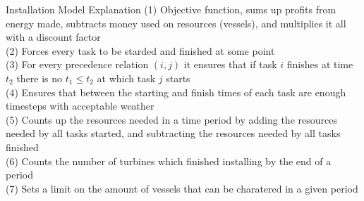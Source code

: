 \documentclass{beamer}
\begin{document}
\begin{frame}{Installation Model Explanation}
(1) Objective function, sums up profits from energy made, subtracts money used on resources (vessels), and multiplies it all with a discount factor	\\
(2) Forces every task to be starded and finished at some point	\\
(3) For every precedence relation $(i, j)$ it ensures that if task $i$ finishes at time $t_2$ there is no $t_1 \leq t_2$ at which task $j$ starts 	\\
(4) Ensures that between the starting and finish times of each task are enough timesteps with acceptable weather	\\
(5) Counts up the resources needed in a time period by adding the resources needed by all tasks started, and subtracting the resources needed by all tasks finished	\\
(6) Counts the number of turbines which finished installing by the end of a period	\\
(7) Sets a limit on the amount of vessels that can be charatered in a given period
\end{frame}
\end{document}
